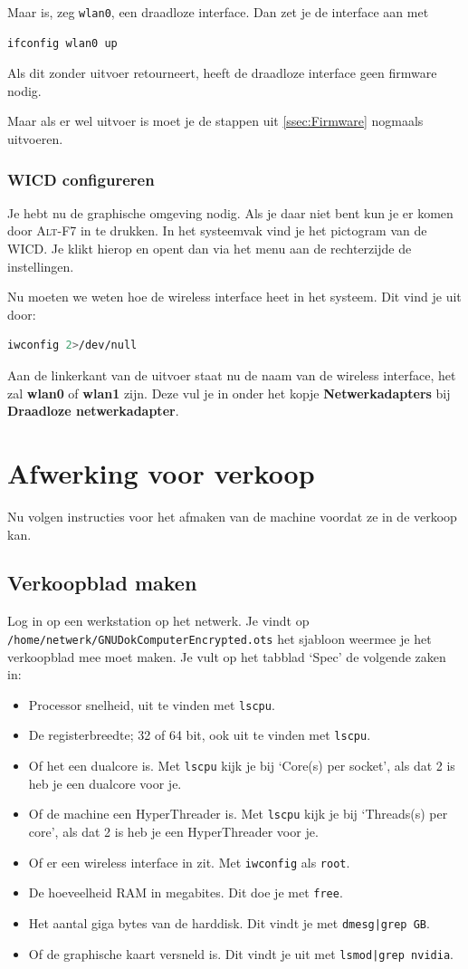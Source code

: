 \documentclass[12pt,a4paper]{article}
\begin{document}
Maar is, zeg \texttt{wlan0}, een draadloze interface. Dan zet je de interface aan met 
\begin{lstlisting}[language=bash]
ifconfig wlan0 up
\end{lstlisting}
Als dit zonder uitvoer retourneert, heeft de draadloze interface geen firmware nodig.

Maar als er wel uitvoer is moet je de stappen uit \ref{ssec:Firmware} nogmaals uitvoeren.
\subsubsection{WICD configureren}
Je hebt nu de graphische omgeving nodig. Als je daar niet bent kun je er komen door \textsc{Alt-F7} in te drukken.
In het systeemvak vind je het pictogram van de WICD. Je klikt hierop en opent dan via het menu aan de rechterzijde de instellingen. 

Nu moeten we weten hoe de wireless interface heet in het systeem. Dit vind je uit door:
\begin{lstlisting}[language=bash]
iwconfig 2>/dev/null
\end{lstlisting}
Aan de linkerkant van de uitvoer staat nu de naam van de wireless interface, het zal \textbf{wlan0} of  \textbf{wlan1} zijn. Deze vul je in onder het kopje \textbf{Netwerkadapters} bij \textbf{Draadloze netwerkadapter}.
\section{Afwerking voor verkoop}
Nu volgen instructies voor het afmaken van de machine voordat ze in de verkoop kan.
\subsection{Verkoopblad maken}
Log in op een werkstation op het netwerk. Je vindt op \texttt{/home/netwerk/GNUDokComputerEncrypted.ots} het sjabloon weermee je het verkoopblad mee moet maken. Je vult op het tabblad `Spec' de volgende zaken in:
\begin{itemize}
	\item Processor snelheid, uit te vinden met \texttt{lscpu}.
	\item De registerbreedte; 32 of 64 bit, ook uit te vinden met \texttt{lscpu}.
	\item Of het een dualcore is. Met \texttt{lscpu} kijk je bij `Core(s) per socket', als dat 2 is heb je een dualcore voor je.
	\item Of de machine een HyperThreader is. Met \texttt{lscpu} kijk je bij `Threads(s) per core', als dat 2 is heb je een HyperThreader voor je. 
	\item Of er een wireless interface in zit. Met \texttt{iwconfig} als \texttt{root}.
	\item De hoeveelheid RAM in megabites. Dit doe je met \texttt{free}.
	\item Het aantal giga bytes van de harddisk. Dit vindt je met \texttt{dmesg|grep GB}.
	\item Of de graphische kaart versneld is. Dit vindt je uit met \texttt{lsmod|grep nvidia}.
\end{itemize}
\end{document}
